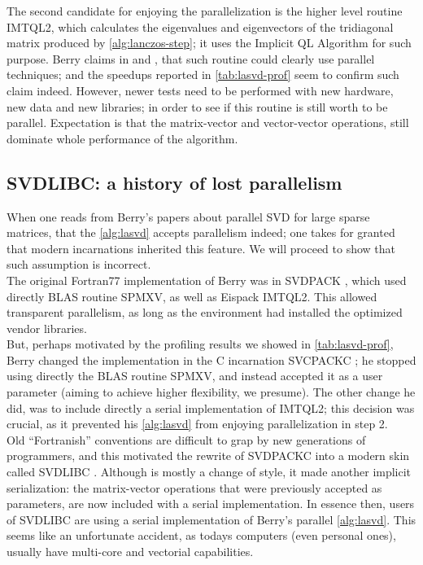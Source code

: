 The second candidate for enjoying the parallelization is the higher
level routine IMTQL2, which calculates the eigenvalues and
eigenvectors of the tridiagonal matrix produced by
\cref{alg:lanczos-step}; it uses the Implicit QL Algorithm
\cite{dubrulle71} for such purpose. Berry claims in \cite{berry91} and
\cite{berry92}, that such 
routine could clearly use parallel techniques; and the speedups
reported in \cref{tab:lasvd-prof} seem to confirm such claim indeed. However,
newer tests need to be performed with new hardware, new data and new
libraries; in order to see if this routine is still worth to be
parallel. Expectation is that the matrix-vector and vector-vector
operations, still dominate whole performance of the algorithm. 

\subsection{SVDLIBC: a history of lost parallelism}

When one reads from Berry's papers about parallel SVD for
large sparse matrices, that the \cref{alg:lasvd} accepts parallelism
indeed; one takes for granted that modern incarnations inherited this
feature. We will proceed to show that such assumption is incorrect. \\

The original Fortran77 
implementation of Berry was in SVDPACK \cite{svdpack}, which used
directly BLAS routine SPMXV, as well as Eispack IMTQL2. This allowed
transparent parallelism, as long as the environment had installed the
optimized vendor libraries. \\

But, perhaps motivated by the profiling results we showed in
\cref{tab:lasvd-prof}, Berry changed the implementation in the C incarnation
SVCPACKC \cite{svdpackc}; he stopped using directly the BLAS routine
SPMXV, and instead accepted it as a user parameter (aiming to
achieve higher flexibility, we presume). The other change he did, was
to include directly a serial implementation of IMTQL2; this decision
was crucial, as it prevented his \cref{alg:lasvd} from enjoying
parallelization in step 2. \\

Old ``Fortranish'' conventions are difficult to grap by new
generations of programmers, and this motivated the rewrite of SVDPACKC
into a modern skin called SVDLIBC \cite{svdlibc}. Although is mostly a
change of style, it made another implicit serialization: the
matrix-vector operations that were previously accepted as parameters,
are now included with a serial implementation. In essence then, users
of SVDLIBC are using a serial implementation of Berry's parallel
\cref{alg:lasvd}. This seems like an unfortunate accident, as todays
computers (even personal ones), usually have multi-core and vectorial
capabilities. \\

